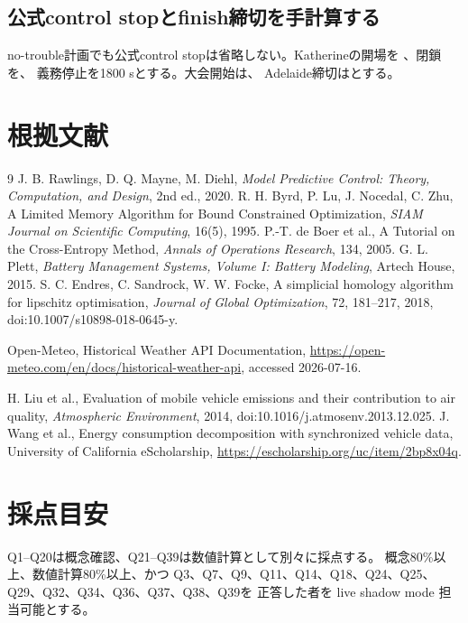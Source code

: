 \subsection{公式control stopとfinish締切を手計算する}
no-trouble計画でも公式control stopは省略しない。Katherineの開場を
、閉鎖を、
義務停止を1800 sとする。大会開始は、
Adelaide締切はとする。


\section{根拠文献}
\begin{thebibliography}{9}
J. B. Rawlings, D. Q. Mayne, M. Diehl,
\textit{Model Predictive Control: Theory, Computation, and Design}, 2nd ed., 2020.
R. H. Byrd, P. Lu, J. Nocedal, C. Zhu,
A Limited Memory Algorithm for Bound Constrained Optimization,
\textit{SIAM Journal on Scientific Computing}, 16(5), 1995.
P.-T. de Boer et al.,
A Tutorial on the Cross-Entropy Method,
\textit{Annals of Operations Research}, 134, 2005.
G. L. Plett,
\textit{Battery Management Systems, Volume I: Battery Modeling},
Artech House, 2015.
S. C. Endres, C. Sandrock, W. W. Focke,
A simplicial homology algorithm for lipschitz optimisation,
\textit{Journal of Global Optimization}, 72, 181--217, 2018,
doi:10.1007/s10898-018-0645-y.
{\raggedright Open-Meteo, Historical Weather API Documentation,
\url{https://open-meteo.com/en/docs/historical-weather-api},
accessed 2026-07-16.\par}
H. Liu et al., Evaluation of mobile vehicle emissions and their contribution to air quality,
\textit{Atmospheric Environment}, 2014, doi:10.1016/j.atmosenv.2013.12.025.
J. Wang et al., Energy consumption decomposition with synchronized vehicle data,
University of California eScholarship, \url{https://escholarship.org/uc/item/2bp8x04q}.
\end{thebibliography}

\section*{採点目安}
Q1--Q20は概念確認、Q21--Q39は数値計算として別々に採点する。
概念80\%以上、数値計算80\%以上、かつ
Q3、Q7、Q9、Q11、Q14、Q18、Q24、Q25、Q29、Q32、Q34、Q36、Q37、Q38、Q39を
正答した者を live shadow mode 担当可能とする。



